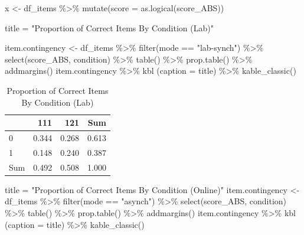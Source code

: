 \documentclass[
  letterpaper,
  DIV=11,
  numbers=noendperiod]{scrreprt}
\newenvironment{Shaded}{\begin{snugshade}}{\end{snugshade}}
\newcommand{\AttributeTok}[1]{\textcolor[rgb]{0.40,0.45,0.13}{#1}}
\newcommand{\FunctionTok}[1]{\textcolor[rgb]{0.28,0.35,0.67}{#1}}
\newcommand{\NormalTok}[1]{\textcolor[rgb]{0.00,0.23,0.31}{#1}}
\newcommand{\OtherTok}[1]{\textcolor[rgb]{0.00,0.23,0.31}{#1}}
\newcommand{\SpecialCharTok}[1]{\textcolor[rgb]{0.37,0.37,0.37}{#1}}
\newcommand{\StringTok}[1]{\textcolor[rgb]{0.13,0.47,0.30}{#1}}
\begin{document}
\begin{Shaded}
\begin{Highlighting}[]
\NormalTok{x }\OtherTok{\textless{}{-}}\NormalTok{ df\_items }\SpecialCharTok{\%\textgreater{}\%} \FunctionTok{mutate}\NormalTok{(}\AttributeTok{score =} \FunctionTok{as.logical}\NormalTok{(score\_ABS))}

\NormalTok{title }\OtherTok{=} \StringTok{"Proportion of Correct Items By Condition (Lab)"}

\NormalTok{item.contingency }\OtherTok{\textless{}{-}}\NormalTok{ df\_items }\SpecialCharTok{\%\textgreater{}\%} \FunctionTok{filter}\NormalTok{(mode }\SpecialCharTok{==} \StringTok{"lab{-}synch"}\NormalTok{) }\SpecialCharTok{\%\textgreater{}\%} \FunctionTok{select}\NormalTok{(score\_ABS, condition) }\SpecialCharTok{\%\textgreater{}\%} \FunctionTok{table}\NormalTok{() }\SpecialCharTok{\%\textgreater{}\%} \FunctionTok{prop.table}\NormalTok{() }\SpecialCharTok{\%\textgreater{}\%} \FunctionTok{addmargins}\NormalTok{()}
\NormalTok{item.contingency }\SpecialCharTok{\%\textgreater{}\%} \FunctionTok{kbl}\NormalTok{ (}\AttributeTok{caption =}\NormalTok{ title) }\SpecialCharTok{\%\textgreater{}\%} \FunctionTok{kable\_classic}\NormalTok{()}
\end{Highlighting}
\end{Shaded}

\begin{table}

\caption{Proportion of Correct Items By Condition (Lab)}
\centering
\begin{tabular}[t]{l|r|r|r}
\hline
  & 111 & 121 & Sum\\
\hline
0 & 0.344 & 0.268 & 0.613\\
\hline
1 & 0.148 & 0.240 & 0.387\\
\hline
Sum & 0.492 & 0.508 & 1.000\\
\hline
\end{tabular}
\end{table}

\begin{Shaded}
\begin{Highlighting}[]
\NormalTok{title }\OtherTok{=} \StringTok{"Proportion of Correct Items By Condition (Online)"}
\NormalTok{item.contingency }\OtherTok{\textless{}{-}}\NormalTok{ df\_items }\SpecialCharTok{\%\textgreater{}\%} \FunctionTok{filter}\NormalTok{(mode }\SpecialCharTok{==} \StringTok{"asynch"}\NormalTok{) }\SpecialCharTok{\%\textgreater{}\%} \FunctionTok{select}\NormalTok{(score\_ABS, condition) }\SpecialCharTok{\%\textgreater{}\%} \FunctionTok{table}\NormalTok{() }\SpecialCharTok{\%\textgreater{}\%} \FunctionTok{prop.table}\NormalTok{() }\SpecialCharTok{\%\textgreater{}\%} \FunctionTok{addmargins}\NormalTok{()}
\NormalTok{item.contingency }\SpecialCharTok{\%\textgreater{}\%} \FunctionTok{kbl}\NormalTok{ (}\AttributeTok{caption =}\NormalTok{ title) }\SpecialCharTok{\%\textgreater{}\%} \FunctionTok{kable\_classic}\NormalTok{()}
\end{Highlighting}
\end{Shaded}
\end{document}
